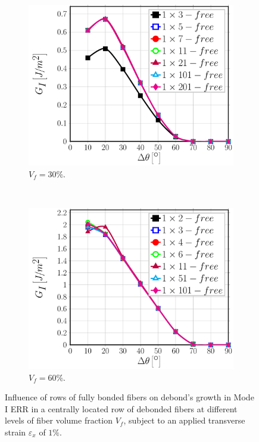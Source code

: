 \begin{figure}[!h]
\centering
    \begin{subfigure}[b]{0.45\textwidth}
        \includegraphics[width=\textwidth]{paperB/abovefibers-vf30-GI.pdf}
        \caption{$V_{f}=30\%$.}\label{paperB:subfig:abovefiber30MI}
    \end{subfigure} ~
    \begin{subfigure}[b]{0.45\textwidth}
        \includegraphics[width=\textwidth]{paperB/abovefibers-vf60-GI.pdf}
        \caption{$V_{f}=60\%$.}\label{paperB:subfig:abovefiber60MI}
    \end{subfigure}

\caption{Influence of rows of fully bonded fibers on debond's growth in Mode I ERR in a centrally located row of debonded fibers at different levels of fiber volume fraction $V_{f}$, subject to an applied transverse strain $\varepsilon_{x}$ of $1\%$.}\label{paperB:fig:abovefibersMI}
\end{figure}

